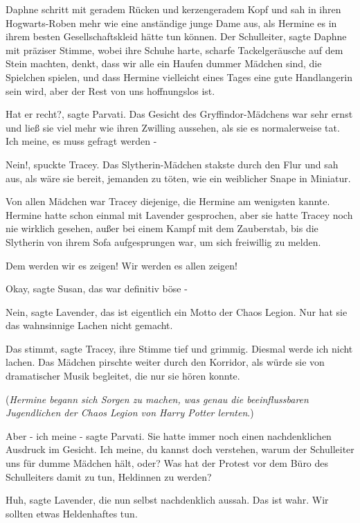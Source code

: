 Daphne schritt mit geradem Rücken und kerzengeradem Kopf und sah in ihren
Hogwarts-Roben mehr wie eine anständige junge Dame aus, als Hermine es in ihrem
besten Gesellschaftskleid hätte tun können. \glqq Der Schulleiter\grqq{}, sagte
Daphne mit präziser Stimme, wobei ihre Schuhe harte, scharfe Tackelgeräusche auf
dem Stein machten, \glqq denkt, dass wir alle ein Haufen dummer Mädchen sind,
die Spielchen spielen, und dass Hermine vielleicht eines Tages eine gute
Handlangerin sein wird, aber der Rest von uns hoffnungslos ist.\grqq{}

\glqq Hat er recht?\grqq{}, sagte Parvati. Das Gesicht des Gryffindor-Mädchens
war sehr ernst und ließ sie viel mehr wie ihren Zwilling aussehen, als sie es
normalerweise tat. \glqq Ich meine, es muss gefragt werden -\grqq{}

\glqq Nein!\grqq{}, spuckte Tracey. Das Slytherin-Mädchen stakste durch den Flur
und sah aus, als wäre sie bereit, jemanden zu töten, wie ein weiblicher Snape in
Miniatur.

Von allen Mädchen war Tracey diejenige, die Hermine am wenigsten kannte. Hermine
hatte schon einmal mit Lavender gesprochen, aber sie hatte Tracey noch nie
wirklich gesehen, außer bei einem Kampf mit dem Zauberstab, bis die Slytherin
von ihrem Sofa aufgesprungen war, um sich freiwillig zu melden.

\glqq Dem werden wir es zeigen! Wir werden es allen zeigen!\grqq{}

\glqq Okay\grqq{}, sagte Susan, \glqq das war definitiv böse -\grqq{}

\glqq Nein\grqq{}, sagte Lavender, \glqq das ist eigentlich ein Motto der Chaos
Legion. Nur hat sie das wahnsinnige Lachen nicht gemacht.\grqq{}

\glqq Das stimmt\grqq{}, sagte Tracey, ihre Stimme tief und grimmig. \glqq
Diesmal werde ich nicht lachen.\grqq{} Das Mädchen pirschte weiter durch den
Korridor, als würde sie von dramatischer Musik begleitet, die nur sie hören
konnte.

(\emph{Hermine begann sich Sorgen zu machen, was genau die beeinflussbaren
Jugendlichen der Chaos Legion von Harry Potter lernten}.)

\glqq Aber - ich meine -\grqq{} sagte Parvati. Sie hatte immer noch einen
nachdenklichen Ausdruck im Gesicht. \glqq Ich meine, du kannst doch verstehen,
warum der Schulleiter uns für dumme Mädchen hält, oder? Was hat der Protest vor
dem Büro des Schulleiters damit zu tun, Heldinnen zu werden?\grqq{}

\glqq Huh\grqq{}, sagte Lavender, die nun selbst nachdenklich aussah. \glqq Das
ist wahr. Wir sollten etwas Heldenhaftes tun.\grqq{}

